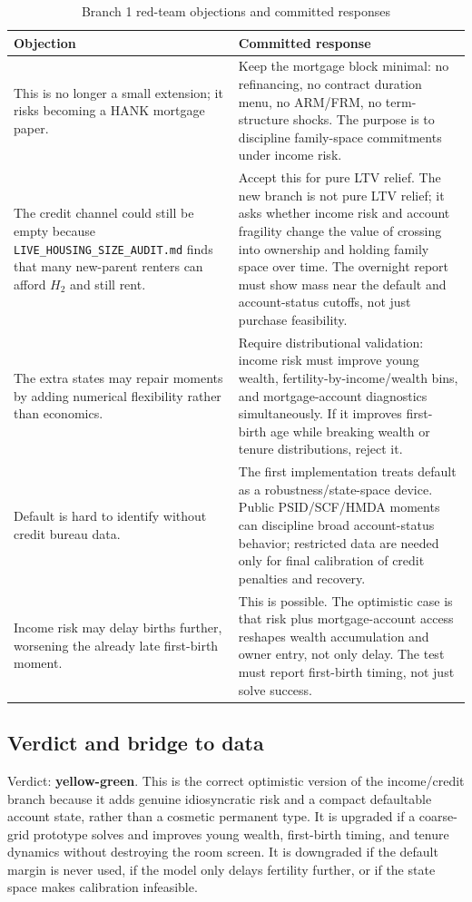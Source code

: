 \documentclass[11pt]{article}
\begin{document}
\begin{table}[!ht]
\centering
\caption{Branch 1 red-team objections and committed responses}
\begin{tabular}{p{}p{}}
\toprule
Objection & Committed response \\
\midrule
This is no longer a small extension; it risks becoming a HANK mortgage paper. & Keep the mortgage block minimal: no refinancing, no contract duration menu, no ARM/FRM, no term-structure shocks. The purpose is to discipline family-space commitments under income risk. \\
The credit channel could still be empty because \texttt{LIVE\_HOUSING\_SIZE\_AUDIT.md} finds that many new-parent renters can afford $H_2$ and still rent. & Accept this for pure LTV relief. The new branch is not pure LTV relief; it asks whether income risk and account fragility change the value of crossing into ownership and holding family space over time. The overnight report must show mass near the default and account-status cutoffs, not just purchase feasibility. \\
The extra states may repair moments by adding numerical flexibility rather than economics. & Require distributional validation: income risk must improve young wealth, fertility-by-income/wealth bins, and mortgage-account diagnostics simultaneously. If it improves first-birth age while breaking wealth or tenure distributions, reject it. \\
Default is hard to identify without credit bureau data. & The first implementation treats default as a robustness/state-space device. Public PSID/SCF/HMDA moments can discipline broad account-status behavior; restricted data are needed only for final calibration of credit penalties and recovery. \\
Income risk may delay births further, worsening the already late first-birth moment. & This is possible. The optimistic case is that risk plus mortgage-account access reshapes wealth accumulation and owner entry, not only delay. The test must report first-birth timing, not just solve success. \\
\bottomrule
\end{tabular}
\end{table}

\subsection{Verdict and bridge to data}

Verdict: \textbf{yellow-green}. This is the correct optimistic version of the income/credit branch because it adds genuine idiosyncratic risk and a compact defaultable account state, rather than a cosmetic permanent type. It is upgraded if a coarse-grid prototype solves and improves young wealth, first-birth timing, and tenure dynamics without destroying the room screen. It is downgraded if the default margin is never used, if the model only delays fertility further, or if the state space makes calibration infeasible.
\end{document}
